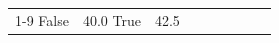 \begin{table}[H]
\begin{tabular}{lllrlllll}
\cline{1-9}
False & 40.0%
\cline{1-9}
True & 42.5%

\end{tabular}
\end{table}
